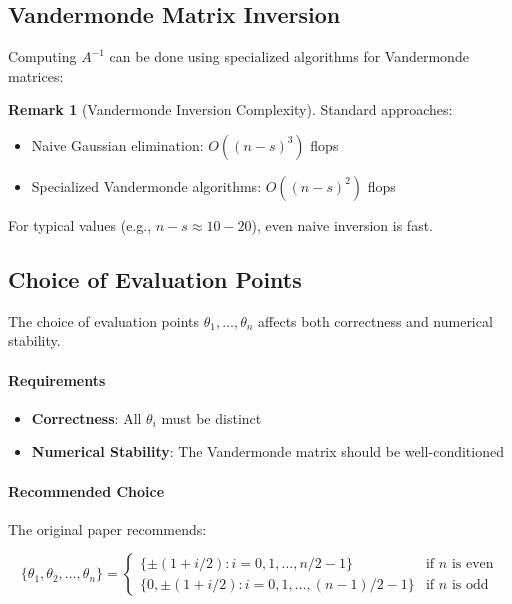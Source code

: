 \documentclass{report}
\theoremstyle{definition}
\newtheorem{remark}[definition]{Remark}
\begin{document}
\subsection{Vandermonde Matrix Inversion}

Computing $A^{-1}$ can be done using specialized algorithms for Vandermonde matrices:

\begin{remark}[Vandermonde Inversion Complexity]
Standard approaches:
\begin{itemize}
    \item Naive Gaussian elimination: $O((n-s)^3)$ flops
    \item Specialized Vandermonde algorithms: $O((n-s)^2)$ flops
\end{itemize}

\noindent For typical values (e.g., $n-s \approx 10-20$), even naive inversion is fast.
\end{remark}

\subsection{Choice of Evaluation Points}
The choice of evaluation points $\theta_1, \ldots, \theta_n$ affects both correctness and numerical stability.

\paragraph{Requirements}

\begin{itemize}
    \item \textbf{Correctness}: All $\theta_i$ must be distinct
    \item \textbf{Numerical Stability}: The Vandermonde matrix should be well-conditioned
\end{itemize}

\paragraph{Recommended Choice}

\noindent The original paper recommends:

\begin{equation}
\{\theta_1, \theta_2, \ldots, \theta_n\} = \begin{cases}
\{\pm(1 + i/2) : i = 0, 1, \ldots, n/2 - 1\} & \text{if } n \text{ is even} \\
\{0, \pm(1 + i/2) : i = 0, 1, \ldots, (n-1)/2 - 1\} & \text{if } n \text{ is odd}
\end{cases}
\end{equation}
\end{document}
